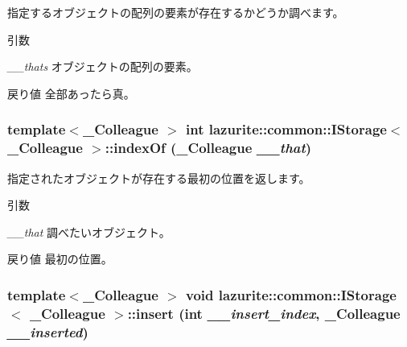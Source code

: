 指定するオブジェクトの配列の要素が存在するかどうか調べます。 
\begin{DoxyParams}{引数}
\item[{\em \_\-\_\-thats}]オブジェクトの配列の要素。\end{DoxyParams}
\begin{DoxyReturn}{戻り値}
全部あったら真。
\end{DoxyReturn}
\hypertarget{interfacelazurite_1_1common_1_1_i_storage_3_01___colleague_01_4_abff9ec059a0222534ab4f925b25a6bec}{
\subsubsection[{indexOf}]{\setlength{\rightskip}{0pt plus 5cm}template$<$\_\-Colleague $>$ int lazurite::common::IStorage$<$ \_\-Colleague $>$::indexOf (\_\-Colleague {\em \_\-\_\-that})}}
\label{interfacelazurite_1_1common_1_1_i_storage_3_01___colleague_01_4_abff9ec059a0222534ab4f925b25a6bec}


指定されたオブジェクトが存在する最初の位置を返します。 
\begin{DoxyParams}{引数}
\item[{\em \_\-\_\-that}]調べたいオブジェクト。\end{DoxyParams}
\begin{DoxyReturn}{戻り値}
最初の位置。
\end{DoxyReturn}
\hypertarget{interfacelazurite_1_1common_1_1_i_storage_3_01___colleague_01_4_aa25ddcc85fa8621f2f5d9c9696d80c0f}{
\subsubsection[{insert}]{\setlength{\rightskip}{0pt plus 5cm}template$<$\_\-Colleague $>$ void lazurite::common::IStorage$<$ \_\-Colleague $>$::insert (int {\em \_\-\_\-insert\_\-index}, \/  \_\-Colleague {\em \_\-\_\-inserted})}}
\label{interfacelazurite_1_1common_1_1_i_storage_3_01___colleague_01_4_aa25ddcc85fa8621f2f5d9c9696d80c0f}


